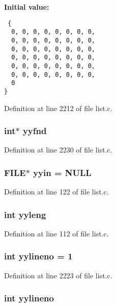 \textbf{Initial value:}

\begin{Code}\begin{verbatim} {
  0, 0, 0, 0, 0, 0, 0, 0,
  0, 0, 0, 0, 0, 0, 0, 0,
  0, 0, 0, 0, 0, 0, 0, 0,
  0, 0, 0, 0, 0, 0, 0, 0,
  0, 0, 0, 0, 0, 0, 0, 0,
  0, 0, 0, 0, 0, 0, 0, 0,
  0
}
\end{verbatim}\end{Code}


Definition at line 2212 of file list.c.
\subsubsection{\setlength{\rightskip}{0pt plus 5cm}int$\ast$ \bf{yyfnd}}\label{list_8c_51dfeda0833f16663c3597f98752ba7f}




Definition at line 2230 of file list.c.
\subsubsection{\setlength{\rightskip}{0pt plus 5cm}FILE$\ast$ \bf{yyin} = NULL}\label{list_8c_46af646807e0797e72b6e8945e7ea88b}




Definition at line 122 of file list.c.
\subsubsection{\setlength{\rightskip}{0pt plus 5cm}int \bf{yyleng}}\label{list_8c_1b5865350b5ca5c1d69f429c2a652953}




Definition at line 112 of file list.c.
\subsubsection{\setlength{\rightskip}{0pt plus 5cm}int \bf{yylineno} = 1}\label{list_8c_5e36364965360da7b7cdfc2188e0af84}




Definition at line 2223 of file list.c.
\subsubsection{\setlength{\rightskip}{0pt plus 5cm}int \bf{yylineno}}\label{list_8c_5e36364965360da7b7cdfc2188e0af84}




